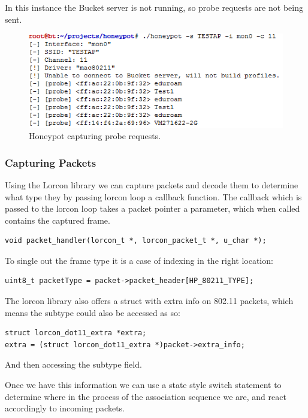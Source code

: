 In this instance the Bucket server is not running, so probe requests are not being sent.

\begin{figure}[h!]
\centering\includegraphics[width=\linewidth]{implementation/figures/hp-running-1.png}
\caption{Honeypot capturing probe requests.}
\label{hp-1}
\end{figure}

\subsubsection{Capturing Packets}
Using the Lorcon library we can capture packets and decode them to determine what type they by passing lorcon loop a callback function. The callback which is passed to the lorcon loop takes a packet pointer a parameter, which when called contains the captured frame. 

\begin{verbatim}
void packet_handler(lorcon_t *, lorcon_packet_t *, u_char *);
\end{verbatim}

To single out the frame type it is a case of indexing in the right location:

\begin{verbatim}
uint8_t packetType = packet->packet_header[HP_80211_TYPE];
\end{verbatim}

The lorcon library also offers a struct with extra info on 802.11 packets, which means the subtype could also be accessed as so:

\begin{verbatim}
struct lorcon_dot11_extra *extra;
extra = (struct lorcon_dot11_extra *)packet->extra_info;
\end{verbatim}

And then accessing the subtype field.

Once we have this information we can use a state style switch statement to determine where in the process of the association sequence we are, and react accordingly to incoming packets.

